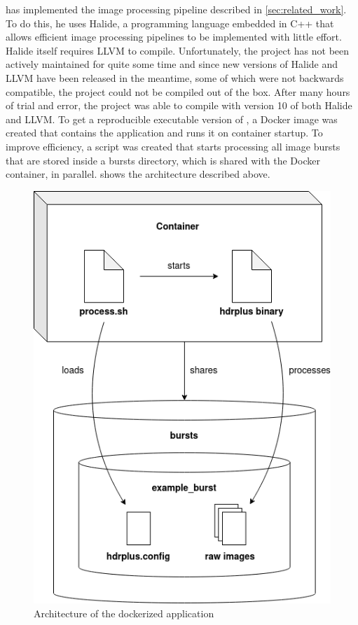 \documentclass{egpubl}
\begin{document}
\cite{Brooks2016git} has implemented the image processing pipeline described in \cref{sec:related_work}. To do this, 
he uses Halide, a programming language embedded in C++ that allows efficient image processing 
pipelines to be implemented with little effort. Halide itself requires LLVM to compile. 
Unfortunately, the project has not been actively maintained for quite some time and 
since new versions of Halide and LLVM have been released in the meantime, some of which were 
not backwards compatible, the project could not be compiled out of the box. After many hours of 
trial and error, the project was able to compile with version 10 of both Halide and LLVM. 
To get a reproducible executable version of \cite{Brooks2016git}, a Docker image was created that 
contains the application and runs it on container startup. To improve efficiency, a script was created 
that starts processing all image bursts that are stored inside a bursts directory, which is shared
with the Docker container, in parallel.  shows the architecture described above.

\begin{figure}
    \hspace{\fill}
    \includegraphics[width=0.9\linewidth]{images/architecture.png}
    \hspace{\fill}
    \centering
    \caption{Architecture of the dockerized application}
    \label{fig:architecture}
\end{figure}
\end{document}
